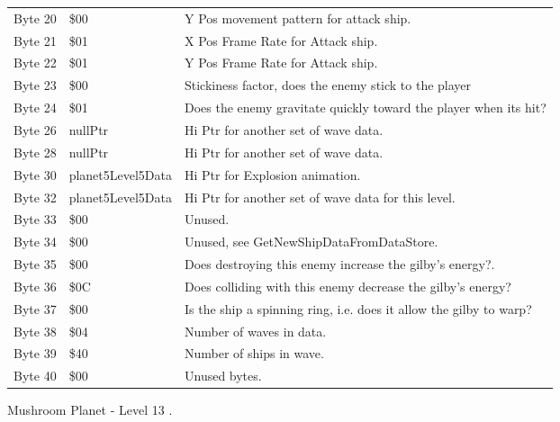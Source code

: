 \begin{figure}[H]
{\begin{adjustbox}{width=12cm}
\begin{tabular}{lll}
 Byte 20 & \$00               & Y Pos movement pattern for attack ship.                            \\
 Byte 21 & \$01               & X Pos Frame Rate for Attack ship.                                  \\
 Byte 22 & \$01               & Y Pos Frame Rate for Attack ship.                                  \\
 Byte 23 & \$00               & Stickiness factor, does the enemy stick to the player              \\
 Byte 24 & \$01               & Does the enemy gravitate quickly toward the player when its hit?   \\
 Byte 26 & nullPtr           & Hi Ptr for another set of wave data.                               \\
 Byte 28 & nullPtr           & Hi Ptr for another set of wave data.                               \\
 Byte 30 & planet5Level5Data & Hi Ptr for Explosion animation.                                    \\
 Byte 32 & planet5Level5Data & Hi Ptr for another set of wave data for this level.                \\
 Byte 33 & \$00               & Unused.                                                            \\
 Byte 34 & \$00               & Unused, see GetNewShipDataFromDataStore.                           \\
 Byte 35 & \$00               & Does destroying this enemy increase the gilby's energy?.           \\
 Byte 36 & \$0C               & Does colliding with this enemy decrease the gilby's energy?        \\
 Byte 37 & \$00               & Is the ship a spinning ring, i.e. does it allow the gilby to warp? \\
 Byte 38 & \$04               & Number of waves in data.                                           \\
 Byte 39 & \$40               & Number of ships in wave.                                           \\
 Byte 40 & \$00               & Unused bytes.                                                      \\
\bottomrule
\end{tabular}

  \end{adjustbox}

  }\caption*{Mushroom Planet - Level 13
.}
\end{figure}

